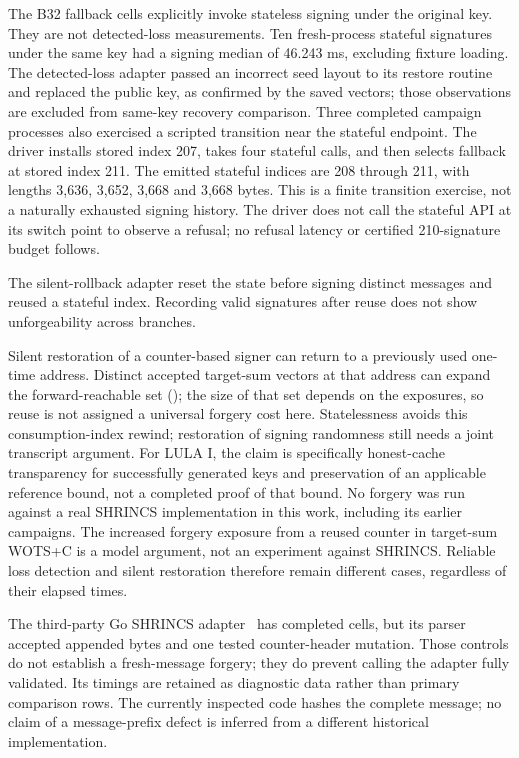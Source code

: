 The B32 fallback cells explicitly invoke stateless signing under the original key. They are not detected-loss measurements. Ten fresh-process stateful signatures under the same key had a signing median of 46.243 ms, excluding fixture loading. The detected-loss adapter passed an incorrect seed layout to its restore routine and replaced the public key, as confirmed by the saved vectors; those observations are excluded from same-key recovery comparison. Three completed campaign processes also exercised a scripted transition near the stateful endpoint. The driver installs stored index 207, takes four stateful calls, and then selects fallback at stored index 211. The emitted stateful indices are 208 through 211, with lengths 3,636, 3,652, 3,668 and 3,668 bytes. This is a finite transition exercise, not a naturally exhausted signing history. The driver does not call the stateful API at its switch point to observe a refusal; no refusal latency or certified 210-signature budget follows.

The silent-rollback adapter reset the state before signing distinct messages and reused a stateful index. Recording valid signatures after reuse does not show unforgeability across branches.

Silent restoration of a counter-based signer can return to a previously used one-time address. Distinct accepted target-sum vectors at that address can expand the forward-reachable set (); the size of that set depends on the exposures, so reuse is not assigned a universal forgery cost here. Statelessness avoids this consumption-index rewind; restoration of signing randomness still needs a joint transcript argument. For LULA I, the claim is specifically honest-cache transparency for successfully generated keys and preservation of an applicable reference bound, not a completed proof of that bound. No forgery was run against a real SHRINCS implementation in this work, including its earlier campaigns. The increased forgery exposure from a reused counter in target-sum WOTS+C is a model argument, not an experiment against SHRINCS. Reliable loss detection and silent restoration therefore remain different cases, regardless of their elapsed times.

The third-party Go SHRINCS adapter~\cite{hashsiggo} has completed cells, but its parser accepted appended bytes and one tested counter-header mutation. Those controls do not establish a fresh-message forgery; they do prevent calling the adapter fully validated. Its timings are retained as diagnostic data rather than primary comparison rows. The currently inspected code hashes the complete message; no claim of a message-prefix defect is inferred from a different historical implementation.

